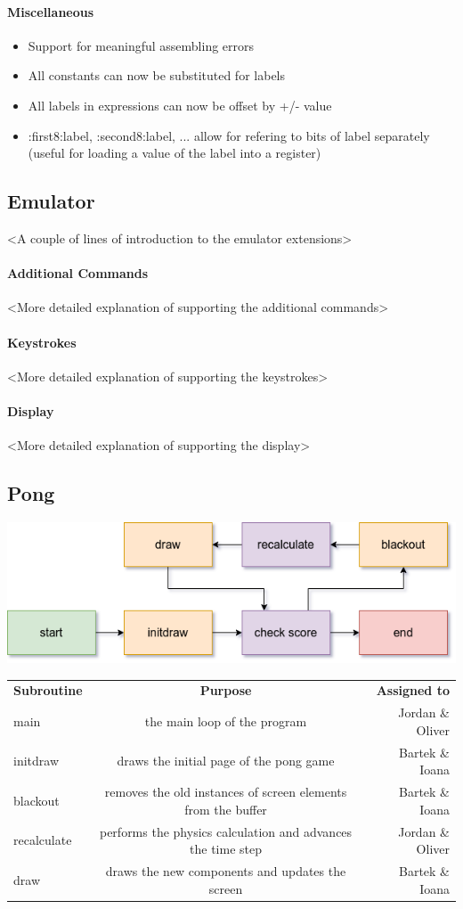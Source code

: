 \documentclass[11pt]{article}
\begin{document}
\paragraph*{Miscellaneous}
\begin{itemize}
\item Support for meaningful assembling errors
\item All constants can now be substituted for labels
\item All labels in expressions can now be offset by +/- value
\item :first8:label, :second8:label, ... allow for refering to bits of label separately (useful for loading a value of the label into a register)
\end{itemize}
\subsection*{Emulator}
<A couple of lines of introduction to the emulator extensions>
\paragraph*{Additional Commands}
<More detailed explanation of supporting the additional commands>
\paragraph*{Keystrokes}
<More detailed explanation of supporting the keystrokes>
\paragraph*{Display}
<More detailed explanation of supporting the display>
\subsection*{Pong}
\begin{center}
	\includegraphics[scale=0.7]{pong}\\
\end{center}
\begin{tabular}{l|c|r}
	\textbf{Subroutine} & \textbf{Purpose} & \textbf{Assigned to}\\
	main & the main loop of the program & Jordan \& Oliver\\
	initdraw & draws the initial page of the pong game & Bartek \& Ioana\\
	blackout & removes the old instances of screen elements from the buffer & Bartek \& Ioana\\
	recalculate & performs the physics calculation and advances the time step & Jordan \& Oliver\\
	draw & draws the new components and updates the screen & Bartek \& Ioana\\
\end{tabular}
\end{document}
